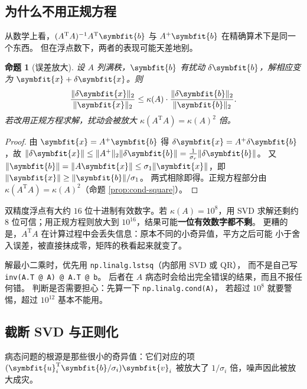 \documentclass[UTF8, 11pt, a4paper, fontset=windows]{ctexart}
\theoremstyle{cnthm}
\newtheorem{prop}[thm]{命题}
\theoremstyle{cndef}
\newcommand{\T}{^{\mathrm{T}}}
\newcommand{\nrm}[1]{\lVert #1 \rVert}
\newcommand{\bu}{\symbfit{u}}
\newcommand{\x}{\symbfit{x}}
\newcommand{\bb}{\symbfit{b}}
\newcommand{\vv}{\symbfit{v}}
\begin{document}
\subsection{为什么不用正规方程}

从数学上看，$(A\T A)^{-1}A\T\bb$ 与 $A^{+}\bb$ 在精确算术下是同一个东西。
但在浮点数下，两者的表现可能天差地别。

\begin{prop}[误差放大]\label{prop:cond-error}
设 $A$ 列满秩，$\bb$ 有扰动 $\delta\bb$，解相应变为 $\x+\delta\x$。则
\begin{equation}
  \frac{\nrm{\delta\x}_2}{\nrm{\x}_2}\le\kappa(A)\cdot
  \frac{\nrm{\delta\bb}_2}{\nrm{\bb}_2} .
\end{equation}
若改用正规方程求解，扰动会被放大 $\kappa(A\T A)=\kappa(A)^2$ 倍。
\end{prop}

\begin{proof}
由 $\x=A^{+}\bb$ 得 $\delta\x=A^{+}\delta\bb$，故
$\nrm{\delta\x}\le\nrm{A^{+}}_2\nrm{\delta\bb}=\frac{1}{\sigma_r}\nrm{\delta\bb}$。
又 $\nrm{\bb}=\nrm{A\x}\le\sigma_1\nrm{\x}$，即 $\nrm{\x}\ge\nrm{\bb}/\sigma_1$。
两式相除即得。正规方程部分由 $\kappa(A\T A)=\kappa(A)^2$（命题 \ref{prop:cond-square}）。
\end{proof}

\begin{insight}[条件数的平方为什么致命]
双精度浮点有大约 $16$ 位十进制有效数字。若 $\kappa(A)=10^{8}$，用 SVD 求解还剩约
$8$ 位可信；用正规方程则放大到 $10^{16}$，结果可能\textbf{一位有效数字都不剩}。
更糟的是，$A\T A$ 在计算过程中会丢失信息：原本不同的小奇异值，平方之后可能
小于舍入误差，被直接抹成零，矩阵的秩看起来就变了。
\end{insight}

\begin{warnbox}[实践建议]
解最小二乘时，优先用 \texttt{np.linalg.lstsq}（内部用 SVD 或 QR），
而不是自己写 \texttt{inv(A.T @ A) @ A.T @ b}。
后者在 $A$ 病态时会给出完全错误的结果，而且不报任何错。
判断是否需要担心：先算一下 \texttt{np.linalg.cond(A)}，
若超过 $10^{8}$ 就要警惕，超过 $10^{12}$ 基本不能用。
\end{warnbox}

\subsection{截断 SVD 与正则化}

病态问题的根源是那些很小的奇异值：它们对应的项
$(\bu_i\T\bb/\sigma_i)\vv_i$ 被放大了 $1/\sigma_i$ 倍，噪声因此被放大成灾。
\end{document}
